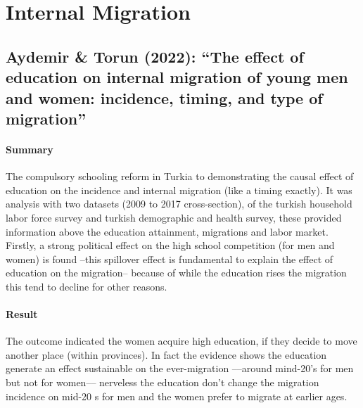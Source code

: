 \documentclass[11pt]{article}
\theoremstyle{prop}
\begin{document}
	\section{Internal Migration}
	
	\subsection{Aydemir \& Torun (2022): ``The effect of education on internal migration of young men and women: incidence, timing, and type of migration''}
	
	\paragraph{Summary}
	The compulsory schooling reform in Turkia to demonstrating the causal effect of education on the incidence and internal migration (like a timing exactly). It was analysis with two datasets (2009 to 2017 cross-section), of the turkish household labor force survey and turkish demographic and health survey, these provided information above the education attainment, migrations and labor market. Firstly, a strong political effect on the high school competition (for men and women) is found –this spillover effect is fundamental to explain the effect of education on the migration– because of while the education rises the migration this tend to decline for other reasons. 
	
	\paragraph{Result} The outcome indicated the women acquire high education, if they decide to move another place (within provinces). In fact the evidence shows the education generate an effect sustainable on the ever-migration –--around mind-20’s for men but not for women–-- nerveless the education don’t change the migration incidence on mid-20 s for men and the women prefer to migrate at earlier ages. 
	
\end{document}
